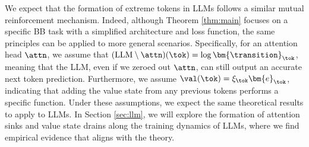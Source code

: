 We expect that the formation of extreme tokens in LLMs follows a similar mutual reinforcement mechanism. Indeed, although Theorem \ref{thm:main} focuses on a specific BB task with a simplified architecture and loss function, the same principles can be applied to more general scenarios. Specifically, for an attention head $\attn$, we assume that $(\text{LLM}\setminus \attn)(\tok) = \log \bm{\transition}_\tok$, meaning that the LLM, even if we zeroed out  $\attn$, can still output an accurate next token prediction. Furthermore, we assume $\val(\tok) = \xi_\tok \bm{e}_\tok$, indicating that adding the value state from any previous tokens performs a specific function. Under these assumptions, we expect the same theoretical results to apply to LLMs. In Section \ref{sec:llm}, we will explore the formation of attention sinks and value state drains along the training dynamics of LLMs, where we find empirical evidence that aligns with the theory. 

